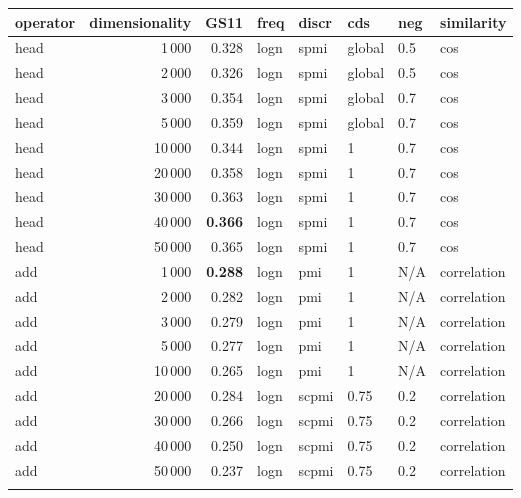 \begin{tabular}{lrrlllll}
\toprule
operator &  dimensionality &   GS11 &  freq &  discr &     cds &  neg &     similarity \\
\midrule
    head &            1\,000 &  0.328 &  logn &   spmi &  global &  0.5 &            cos \\
    head &            2\,000 &  0.326 &  logn &   spmi &  global &  0.5 &            cos \\
    head &            3\,000 &  0.354 &  logn &   spmi &  global &  0.7 &            cos \\
    head &            5\,000 &  0.359 &  logn &   spmi &  global &  0.7 &            cos \\
    head &           10\,000 &  0.344 &  logn &   spmi &       1 &  0.7 &            cos \\
    head &           20\,000 &  0.358 &  logn &   spmi &       1 &  0.7 &            cos \\
    head &           30\,000 &  0.363 &  logn &   spmi &       1 &  0.7 &            cos \\
    head &           40\,000 &  \textbf{0.366} &  logn &   spmi &       1 &  0.7 &            cos \\
    head &           50\,000 &  0.365 &  logn &   spmi &       1 &  0.7 &            cos \\ \addlinespace
     add &            1\,000 &  \textbf{0.288} &  logn &    pmi &       1 &  N/A &    correlation \\
     add &            2\,000 &  0.282 &  logn &    pmi &       1 &  N/A &    correlation \\
     add &            3\,000 &  0.279 &  logn &    pmi &       1 &  N/A &    correlation \\
     add &            5\,000 &  0.277 &  logn &    pmi &       1 &  N/A &    correlation \\
     add &           10\,000 &  0.265 &  logn &    pmi &       1 &  N/A &    correlation \\
     add &           20\,000 &  0.284 &  logn &  scpmi &    0.75 &  0.2 &    correlation \\
     add &           30\,000 &  0.266 &  logn &  scpmi &    0.75 &  0.2 &    correlation \\
     add &           40\,000 &  0.250 &  logn &  scpmi &    0.75 &  0.2 &    correlation \\
     add &           50\,000 &  0.237 &  logn &  scpmi &    0.75 &  0.2 &    correlation \\ \addlinespace

\end{tabular}
